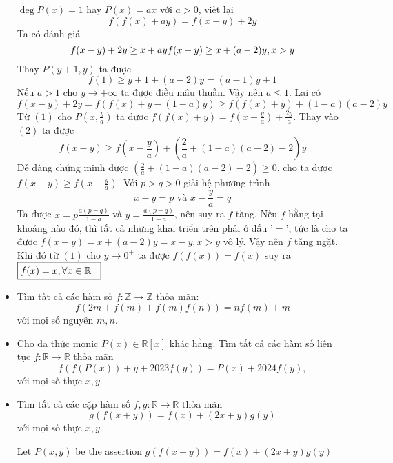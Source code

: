 \documentclass[11pt]{scrartcl}
\begin{document}
\begin{itemize}[label=, leftmargin=0em, itemsep=0.5em]
\begin{sol}
        $\deg{P(x)} = 1$ hay $P(x) = ax$ với $a > 0$, viết lại 
        \[
            f(f(x) + ay)  = f(x - y) + 2y\tag{1}
        \]
        Ta có đánh giá 
        \[
            f(x - y) + 2y \geq x + ay \lra f( x -y) \geq x + (a - 2)y, x > y
        \]
        Thay $P(y + 1,y)$ ta được
        \[
            f(1) \geq y + 1 + (a - 2)y = (a - 1)y + 1
        \]
        Nếu $a > 1$ cho $y \to +\infty$ ta được điều mâu thuẫn. Vậy nên $a \leq 1$. Lại có 
        \[
            f(x - y) + 2y = f(f(x) + y - (1 - a)y) \geq f(f(x) + y )+ (1 -a)(a - 2)y\tag{2}
        \]
        Từ $(1)$ cho $P\left(x,\frac{y}{a}\right)$ ta được $f(f(x) + y) = f\left(x - \frac{y}{a}\right) + \frac{2y}{a}$. Thay vào $(2)$ ta được
        \[
            f(x - y) \geq f\left(x - \frac{y}{a}\right) + \left(\frac{2}{a} + (1 - a)(a - 2) - 2\right)y
        \]
        Dễ dàng chứng minh được $\left(\frac{2}{a} + (1 - a)(a - 2) - 2\right) \geq 0$, cho ta được $f(x - y) \geq f(x - \frac{y}{a})$. Với $p > q > 0$ giải hệ phương trình 
        \[
            x - y = p \text{ và } x - \frac{y}{a} = q
        \]
        Ta được $x = p \frac{a(p - q)}{1 - a}$ và $y = \frac{a(p - q)}{1 - a}$, nên suy ra $f$ tăng. Nếu $f$ hằng tại khoảng nào đó, thì tất cả những khai triển trên phải ở dấu '$=$', tức là cho ta được $f(x - y) = x+ (a - 2)y = x - y, x > y$ vô lý. Vậy nên $f$ tăng ngặt. Khi đó từ $(1)$ cho $y \to 0^+$ ta được $f(f(x)) = f(x)$ suy ra  $\boxed{f(x) = x,\forall x\in \mathbb{R^+}}$
    \end{sol}
    \item \begin{btvn} Tìm tất cả các hàm số $f:\mathbb{Z}\to \mathbb{Z}$ thỏa mãn:
        \[ f(2m+f(m)+f(m)f(n))=nf(m)+m \]
    với mọi số nguyên $m,n$.
    \end{btvn}
    \item \begin{btvn}Cho đa thức monic $P(x) \in \mathbb{R}[x]$ khác hằng. Tìm tất cả các hàm số liên tục $f: \mathbb{R} \to \mathbb{R}$ thỏa mãn
        $$f(f(P(x))+y+2023f(y))=P(x)+2024f(y),$$
        với mọi số thực $x,y$.
    \end{btvn}

    \item \begin{bt}
        Tìm tất cả các cặp hàm số $f,g: \mathbb{R} \to \mathbb{R}$ thỏa mãn
        \[g(f(x+y)) = f(x) + (2x + y)g(y) \tag{1}\]
        với mọi số thực $x,y$.
    \end{bt}
    \begin{sol}
        Let $P(x,y)$ be the assertion $g(f(x+y))=f(x)+(2x+y)g(y)$


\end{sol}
\end{itemize}
\end{document}
